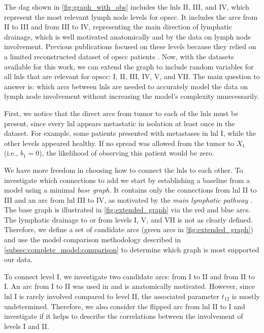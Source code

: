 \documentclass[twocolumn]{article}
\begin{document}
The \gls{dag} shown in \cref{fig:graph_with_obs} includes the \glspl{lnl} II, III, and IV, which represent the most relevant lymph node levels for \gls{opscc}. It includes the arcs from II to III and from III to IV, representing the main direction of lymphatic drainage, which is well motivated anatomically and by the data on lymph node involvement. Previous publications  \cite{pouymayou_bayesian_2019,ludwig_hidden_2021} focused on these levels because they relied on a limited reconstructed dataset of \gls{opscc} patients \cite{sanguineti_defining_2009}. Now, with the datasets available for this work, we can extend the graph to include random variables for all \glspl{lnl} that are relevant for \gls{opscc}: I, II, III, IV, V, and VII. The main question to answer is: which arcs between \glspl{lnl} are needed to accurately model the data on lymph node involvement without increasing the model's complexity unnecessarily.

First, we notice that the direct arcs from tumor to each of the \glspl{lnl} must be present, since every \gls{lnl} appears metastatic in isolation at least once in the dataset. For example, some patients presented with metastases in \gls{lnl} I, while the other levels appeared healthy. If no spread was allowed from the tumor to $X_1$ (i.e., $b_1 = 0$), the likelihood of observing this patient would be zero.

We have more freedom in choosing how to connect the \glspl{lnl} to each other. To investigate which connections to add we start by establishing a baseline from a model using a minimal \emph{base graph}. It contains only the connections from \gls{lnl} II to III and an arc from \gls{lnl} III to IV, as motivated by the \emph{main lymphatic pathway} \cite{lengele_anatomical_2007}. The base graph is illustrated in \cref{fig:extended_graph} via the red and blue arcs. The lymphatic drainage to or from levels I, V, and VII is not as clearly defined. Therefore, we define a set of candidate arcs (green arcs in \cref{fig:extended_graph}) and use the model comparison methodology described in \cref{subsec:complete_model:comparison} to determine which graph is most supported our data. 

To connect level I, we investigate two candidate arcs: from I to II and from II to I. An arc from I to II was used in \cite{pouymayou_bayesian_2019,ludwig_hidden_2021} and is anatomically motivated. However, since \gls{lnl} I is rarely involved compared to level II, the associated parameter $t_{12}$ is mostly undetermined. Therefore, we also consider the flipped arc from \gls{lnl} II to I and investigate if it helps to describe the correlations between the involvement of levels I and II.
\end{document}
